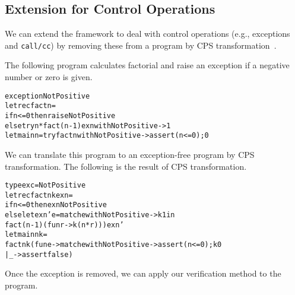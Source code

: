 \subsection{Extension for Control Operations}
\label{sec:control} We can extend the framework to deal with control
operations (e.g., exceptions and \texttt{call/cc}) by removing these
from a program by CPS transformation~\cite{Nielsen2001}.

The following program calculates factorial and raise an exception if
a negative number or zero is given.
\begin{alltt}
exception NotPositive
let rec fact n =
  if n <= 0 then raise NotPositive
  else try n * fact (n - 1) exn with NotPositive -> 1
let main n = try fact n with NotPositive -> assert (n <= 0); 0
\end{alltt}
We can translate this program to an exception-free program by CPS transformation.
The following is the result of CPS transformation.
\begin{alltt}
type exc = NotPositive
let rec fact n k exn =
  if n <= 0 then exn NotPositive
  else let exn' e = match e with NotPositive -> k 1 in
         fact (n - 1) (fun r -> k (n * r))) exn'
let main n k =
  fact n k (fun e -> match e with NotPositive -> assert (n <= 0); k 0
                                | _ -> assert false)
\end{alltt}
Once the exception is removed, we can apply our verification method to the
program.


